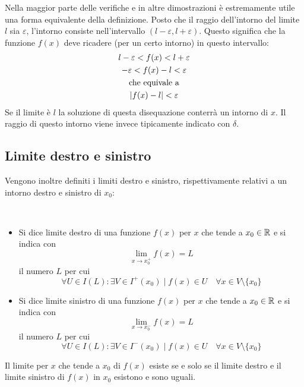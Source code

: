 Nella maggior parte delle verifiche e in altre dimostrazioni è estremamente utile una forma equivalente della definizione. Posto che il raggio dell'intorno del limite $l$ sia $\varepsilon$, l'intorno consiste nell'intervallo $(l-\varepsilon,l+\varepsilon)$. Questo significa che la funzione $f(x)$ deve ricadere (per un certo intorno) in questo intervallo:
\begin{gather*}
	l-\varepsilon<f(x)<l+\varepsilon\\
	-\varepsilon<f(x)-l<\varepsilon\\
	\text{che equivale a}\\
	\left\lvert f(x)-l \right\rvert<\varepsilon
\end{gather*}
Se il limite è $l$ la soluzione di questa disequazione conterrà un intorno di $x$. Il raggio di questo intorno viene invece tipicamente indicato con $\delta$.


\subsection{Limite destro e sinistro}
Vengono inoltre definiti i limiti destro e sinistro, rispettivamente relativi a un intorno destro e sinistro di $x_0$:
\begin{defin}
	~
	\begin{itemize}
		\item Si dice limite destro di una funzione $f(x)$ per $x$ che tende a $x_0\in\mathbb{R}$ e si indica con
		      \[
			      \lim_{x\to x_0^+} f(x)=L
		      \]
		      il numero $L$ per cui
		      \[
			      \forall U\in I(L): \exists V\in I^+(x_0)\mid f(x)\in U \quad\forall x\in V\setminus\{x_0\}
		      \]
		\item Si dice limite sinistro di una funzione $f(x)$ per $x$ che tende a $x_0\in\mathbb{R}$ e si indica con
		      \[
			      \lim_{x\to x_0^-} f(x)=L
		      \]
		      il numero $L$ per cui
		      \[
			      \forall U\in I(L): \exists V\in I^-(x_0)\mid f(x)\in U \quad\forall x\in V\setminus\{x_0\}
		      \]
	\end{itemize}
	Il limite per $x$ che tende a $x_0$ di $f(x)$ esiste se e solo se il limite destro e il limite sinistro di $f(x)$ in $x_0$ esistono e sono uguali.
\end{defin}
